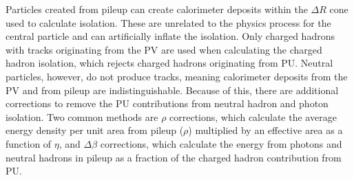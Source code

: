 Particles created from pileup can create calorimeter deposits within the $\Delta R$ cone used to calculate isolation. These are unrelated to the physics process for the central particle and can artificially inflate the isolation. Only charged hadrons with tracks originating from the PV are used when calculating the charged hadron isolation, which rejects charged hadrons originating from PU. Neutral particles, however, do not produce tracks, meaning calorimeter deposits from the PV and from pileup are indistinguishable. Because of this, there are additional corrections to remove the PU contributions from neutral hadron and photon isolation. Two common methods are $\rho$ corrections, which calculate the average energy density per unit area from pileup ($\rho$) multiplied by an effective area as a function of $\eta$, and $\Delta\beta$ corrections, which calculate the energy from photons and neutral hadrons in pileup as a fraction of the charged hadron contribution from PU.

